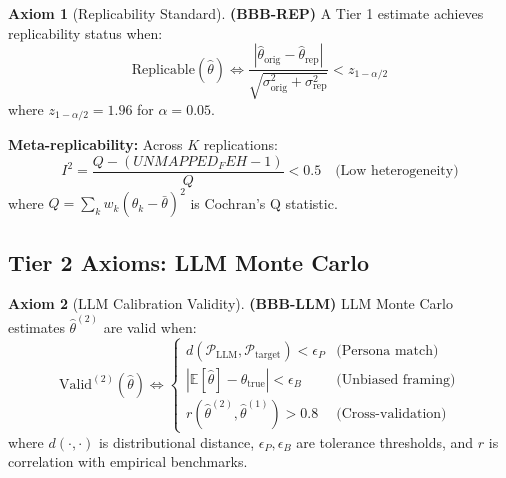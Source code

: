 \documentclass[11pt,a4paper]{article}
\theoremstyle{definition}
\newtheorem{axiom}{Axiom}[section]
\begin{document}
\begin{axiom}[Replicability Standard]
\label{ax:bbb-rep}
\textbf{(BBB-REP)} A Tier 1 estimate achieves replicability status when:
\begin{equation}
\text{Replicable}(\hat{\theta}) \Leftrightarrow 
\frac{|\hat{\theta}_{\text{orig}} - \hat{\theta}_{\text{rep}}|}{\sqrt{\sigma^2_{\text{orig}} + \sigma^2_{\text{rep}}}} < z_{1-\alpha/2}
\end{equation}
where $z_{1-\alpha/2} = 1.96$ for $\alpha = 0.05$.

\textbf{Meta-replicability:} Across $K$ replications:
\begin{equation}
I^2 = \frac{Q - (UNMAPPED_FEH-1)}{Q} < 0.5 \quad \text{(Low heterogeneity)}
\end{equation}
where $Q = \sum_k w_k (\hat{\theta}_k - \bar{\theta})^2$ is Cochran's Q statistic.
\end{axiom}

\subsection{Tier 2 Axioms: LLM Monte Carlo}

\begin{axiom}[LLM Calibration Validity]
\label{ax:bbb-llm-full}
\textbf{(BBB-LLM)} LLM Monte Carlo estimates $\hat{\theta}^{(2)}$ are valid when:
\begin{equation}
\text{Valid}^{(2)}(\hat{\theta}) \Leftrightarrow 
\begin{cases}
d(\mathcal{P}_{\text{LLM}}, \mathcal{P}_{\text{target}}) < \epsilon_P & \text{(Persona match)} \\
|\mathbb{E}[\hat{\theta}] - \theta_{\text{true}}| < \epsilon_B & \text{(Unbiased framing)} \\
r(\hat{\theta}^{(2)}, \hat{\theta}^{(1)}) > 0.8 & \text{(Cross-validation)}
\end{cases}
\end{equation}
where $d(\cdot, \cdot)$ is distributional distance, $\epsilon_P, \epsilon_B$ are 
tolerance thresholds, and $r$ is correlation with empirical benchmarks.
\end{axiom}
\end{document}
